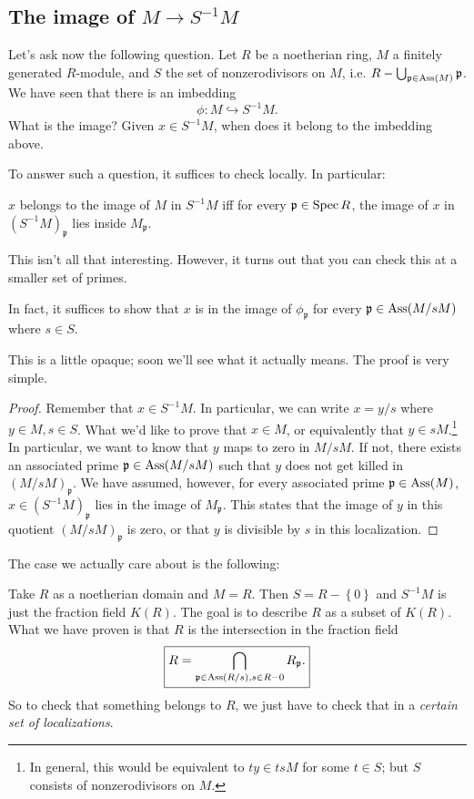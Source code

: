 \subsection{The image of $M \to S^{-1}M$}
Let's ask now the following question. Let $R$ be a noetherian ring, $M$
a finitely generated
$R$-module, and $S$ the set of nonzerodivisors on $M$, i.e. $R -
\bigcup_{\mathfrak{p} \in \operatorname{Ass}(M)} \mathfrak{p}$. We have seen that there is an
imbedding
\[ \phi: M \hookrightarrow S^{-1}M.  \]
What is the image? Given $x \in S^{-1}M$, when does it belong to the imbedding
above.

To answer such a question, it suffices to check locally. In particular:
\begin{proposition}
$x$ belongs to the image of $M $ in $S^{-1}M$ iff for every $\mathfrak{p} \in
\operatorname{Spec} R$, the image of $x$ in $(S^{-1}M)_{\mathfrak{p}}$ lies inside
$M_{\mathfrak{p}}$.
\end{proposition}

This isn't all that interesting. However, it turns out that you can check this
at a smaller set of primes.

\begin{proposition}
In fact, it suffices to show that $x$ is in the image of $\phi_{\mathfrak{p}}$
for every $\mathfrak{p} \in \operatorname{Ass}(M/sM)$ where $s \in S$.
\end{proposition}
This is a little opaque; soon we'll see what it actually means.
The proof is very simple.

\begin{proof}
Remember that $ x \in S^{-1}M$. In particular, we can write $x = y/s$ where $y
\in M, s \in S$. What we'd like to prove that $x \in M$, or equivalently that
$y \in sM$.\footnote{In general, this would be equivalent to $ty \in tsM$ for
some $t \in S$; but $S$ consists of nonzerodivisors on $M$.}
In particular, we want to know that $y$ maps to zero in $M/sM$. If not, there
exists an associated prime $\mathfrak{p} \in \operatorname{Ass}(M/sM)$ such that $y$ does not
get
killed in $(M/sM)_{\mathfrak{p}}$.
We have assumed, however, for every associated prime $\mathfrak{p}\in \operatorname{Ass}(M)$,
$x \in ( S^{-1}M)_{\mathfrak{p}}$ lies in the image of $M_{\mathfrak{p}}$. This
states that the image of $y$ in this quotient $(M/sM)_{\mathfrak{p}}$ is zero,
or that $y$ is divisible by $s$ in this localization.
\end{proof}

The case we actually care about is the following:

Take $R$ as a noetherian domain and $M = R$.  Then $S = R - \left\{0\right\}$
and $S^{-1}M $ is just the fraction field $K(R)$.  The goal is to describe $R$
as a subset of $K(R)$. What we have proven is that $R$ is the intersection in
the fraction field
\[ \boxed{ R = \bigcap_{\mathfrak{p} \in \operatorname{Ass}(R/s), s \in R - 0}
R_{\mathfrak{p}} . }\]
So to check that something belongs to $R$, we just have to check that in a
\emph{certain set of localizations}.

